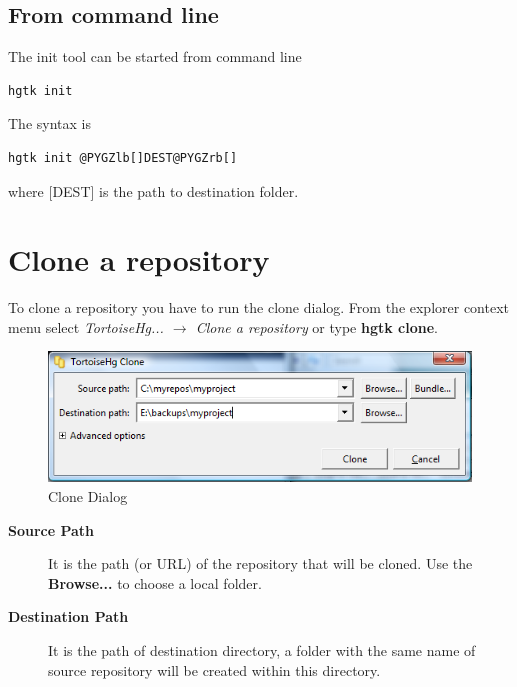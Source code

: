\documentclass[letterpaper,10pt,english]{manual}
\begin{document}
\subsection{From command line}

The init tool can be started from command line

\begin{Verbatim}[commandchars=@\[\]]
hgtk init
\end{Verbatim}

The syntax is

\begin{Verbatim}[commandchars=@\[\]]
hgtk init @PYGZlb[]DEST@PYGZrb[]
\end{Verbatim}

where {[}DEST{]} is the path to destination folder.

\resetcurrentobjects
\hypertarget{--doc-clone}{}

\section{Clone a repository}
\hypertarget{module-clone.dialog}{}
To clone a repository you have to run the clone dialog.
From the explorer context menu select \emph{TortoiseHg... \(\rightarrow\) Clone a repository}
or type \textbf{hgtk clone}.
\begin{figure}[htbp]
\centering

\includegraphics{clone.png}
\caption{Clone Dialog}\end{figure}
\begin{description}
\item[\textbf{Source Path}]
It is the path (or URL) of the repository that will be cloned. Use
the \textbf{Browse...} to choose a local folder.

\item[\textbf{Destination Path}]
It is the path of destination directory, a folder with the same name
of source repository will be created within this directory.

\end{description}
\end{document}
